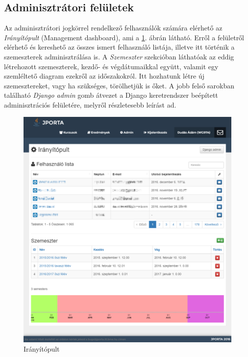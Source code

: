 \subsection{Adminisztrátori felületek}
Az adminisztrátori jogkörrel rendelkező felhasználók számára elérhető az \textit{Irányítópult} (Management dashboard), ami a \ref{figure:jporta-management-dashboard}. ábrán látható.
Erről a felületről elérhető és kereshető az összes ismert felhasználó listája, illetve itt történik a szemeszterek adminisztrálása is.
A \textit{Szemeszter} szekcióban láthatóak az eddig létrehozott szemeszterek, kezdő- és végdátumaikkal együtt, valamit egy szemléltető diagram ezekről az időszakokról.
Itt hozhatunk létre új szemesztereket, vagy ha szükséges, törölhetjük is őket. 
A jobb felső sarokban található \textit{Django admin} gomb átvezet a Django keretrendszer beépített adminisztrációs felületére, melyről részletesebb leírást \cite{DjangoAdmin} ad.
\begin{figure}[h]
    \centering
    \includegraphics[width=\textwidth]{figures/Jporta-management-dashboard}
    \caption{Irányítópult}
    \label{figure:jporta-management-dashboard}
\end{figure}

\sectsep

